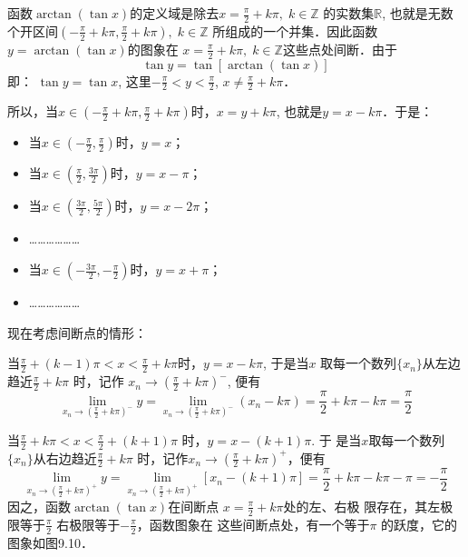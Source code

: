 \begin{solution}
函数$\arctan (\tan x)$的定义域是除去$x=\frac{\pi}{2}+k\pi,\; k\in\mathbb{Z}$
的实数集$\mathbb{R}$, 也就是无数个开区间$\left(-\frac{\pi}{2}+k\pi,\frac{\pi}{2}+k\pi\right),\; k\in\mathbb{Z}$
所组成的一个并集．因此函数$y=\arctan (\tan x)$的图象在
$x=\frac{\pi}{2}+k\pi,\; k\in\mathbb{Z}$这些点处间断．由于
\[\tan y=\tan[\arctan(\tan x)]\]
即：
$\tan y=\tan x$, 这里$-\frac{\pi}{2}<y<\frac{\pi}{2}$, $x\ne \frac{\pi}{2}+k\pi$．

所以，当$x\in\left(-\frac{\pi}{2}+k\pi,\frac{\pi}{2}+k\pi\right)$时，$x=y+k\pi$, 也就是$y=x-k\pi$．于是：
\begin{itemize}
    \item 当$x\in\left(-\frac{\pi}{2},\frac{\pi}{2}\right)$时，$y=x$；
    \item 当$x\in\left(\frac{\pi}{2},\frac{3\pi}{2}\right)$时，$y=x-\pi$；
    \item 当$x\in\left(\frac{3\pi}{2},\frac{5\pi}{2}\right)$时，$y=x-2\pi$；
    \item ………………
    \item 当$x\in\left(-\frac{3\pi}{2},-\frac{\pi}{2}\right)$时，$y=x+\pi$；
    \item ………………
\end{itemize}
现在考虑间断点的情形：

当$\frac{\pi}{2}+(k-1)\pi<x<\frac{\pi}{2}+k\pi$时，$y=x-k\pi$, 于是当$x$
取每一个数列$\{x_n\}$从左边趋近$\frac{\pi}{2}+k\pi$ 时，记作
$x_n\to \left(\frac{\pi}{2}+k\pi \right)^-$, 
便有
\[\lim_{x_n\to \left(\tfrac{\pi}{2}+k\pi \right)^-}y=\lim_{x_n\to \left(\tfrac{\pi}{2}+k\pi \right)^-}(x_n-k\pi)=\frac{\pi}{2}+k\pi-k\pi=\frac{\pi}{2}\]

当$\frac{\pi}{2}+k\pi <x<\frac{\pi}{2}+(k+1)\pi$ 时，$y=x-(k+1)\pi$. 于
是当$x$取每一个数列$\{x_n\}$从右边趋近$\frac{\pi}{2}+k\pi$ 时，记作$x_n\to \left(\frac{\pi}{2}+k\pi\right)^+$，便有
\[\lim_{x_n\to \left(\tfrac{\pi}{2}+k\pi \right)^+}y=\lim_{x_n\to \left(\tfrac{\pi}{2}+k\pi \right)^+}[x_n-(k+1)\pi]=\frac{\pi}{2}+k\pi-k\pi-\pi=-\frac{\pi}{2}\]
因之，函数$\arctan(\tan x)$在间断点
$x=\frac{\pi}{2}+k\pi$处的左、右极
限存在，其左极限等于$\frac{\pi}{2}$
右极限等于$-\frac{\pi}{2}$，函数图象在
这些间断点处，有一个等于$\pi$ 的跃度，它的图象如图9.10．

\begin{figure}[htp]
    \centering
{}
    \caption{}
\end{figure}
\end{solution}

